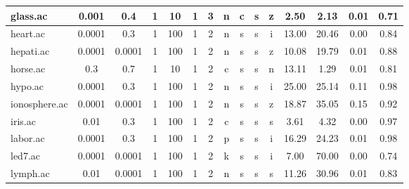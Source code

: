 \begin{table}[htbp]
\begin{tabular}{|l|c|c|c|c|c|c|c|c|c|c||c|c|c|c|}
		\hline
		glass.ac       & 0.001    & 0.4         & 1              & 10                  & 1             & 3        & n             & c      & s        & z        & 2.50           & 2.13           & 0.01           & 0.71           \\
		\hline
		heart.ac       & 0.0001   & 0.3         & 1              & 100                 & 1             & 2        & n             & s      & s        & i        & 13.00          & 20.46          & 0.00           & 0.84           \\
		\hline
		hepati.ac      & 0.0001   & 0.0001      & 1              & 100                 & 1             & 2        & n             & s      & s        & z        & 10.08          & 19.79          & 0.01           & 0.88           \\
		\hline
		horse.ac       & 0.3      & 0.7         & 1              & 10                  & 1             & 2        & c             & s      & s        & n        & 13.11          & 1.29           & 0.01           & 0.81           \\
		\hline
		hypo.ac        & 0.0001   & 0.3         & 1              & 100                 & 1             & 2        & n             & s      & s        & i        & 25.00          & 25.14          & 0.11           & 0.98           \\
		\hline
		ionosphere.ac  & 0.0001   & 0.0001      & 1              & 100                 & 1             & 2        & n             & s      & s        & z        & 18.87          & 35.05          & 0.15           & 0.92           \\
		\hline
		iris.ac        & 0.01     & 0.3         & 1              & 100                 & 1             & 2        & c             & s      & s        & s        & 3.61           & 4.32           & 0.00           & 0.97           \\
		\hline
		labor.ac       & 0.0001   & 0.3         & 1              & 100                 & 1             & 2        & p             & s      & s        & i        & 16.29          & 24.23          & 0.01           & 0.98           \\
		\hline
		led7.ac        & 0.0001   & 0.0001      & 1              & 100                 & 1             & 2        & k             & s      & s        & i        & 7.00           & 70.00          & 0.00           & 0.74           \\
		\hline
		lymph.ac       & 0.01     & 0.0001      & 1              & 100                 & 1             & 2        & n             & s      & s        & s        & 11.26          & 30.96          & 0.01           & 0.83           \\

\end{tabular}
\end{table}
